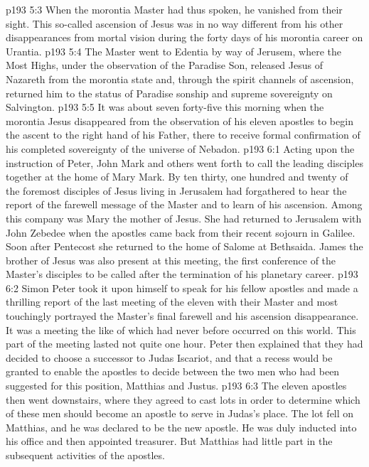 \pc \vs p193 5:3 When the morontia Master had thus spoken, he vanished from their sight. This so\hyp{}called ascension of Jesus was in no way different from his other disappearances from mortal vision during the forty days of his morontia career on Urantia.
\vs p193 5:4 The Master went to Edentia by way of Jerusem, where the Most Highs, under the observation of the Paradise Son, released Jesus of Nazareth from the morontia state and, through the spirit channels of ascension, returned him to the status of Paradise sonship and supreme sovereignty on Salvington.\plusone
\vs p193 5:5 It was about seven forty\hyp{}five this morning when the morontia Jesus disappeared from the observation of his eleven apostles to begin the ascent to the right hand of his Father, there to receive formal confirmation of his completed sovereignty of the universe of Nebadon.
\vs p193 6:1 Acting upon the instruction of Peter, John Mark and others went forth to call the leading disciples together at the home of Mary Mark. By ten thirty, one hundred and twenty of the foremost disciples of Jesus living in Jerusalem had forgathered to hear the report of the farewell message of the Master and to learn of his ascension. Among this company was Mary the mother of Jesus. She had returned to Jerusalem with John Zebedee when the apostles came back from their recent sojourn in Galilee. Soon after Pentecost she returned to the home of Salome at Bethsaida. James the brother of Jesus was also present at this meeting, the first conference of the Master’s disciples to be called after the termination of his planetary career.
\vs p193 6:2 Simon Peter took it upon himself to speak for his fellow apostles and made a thrilling report of the last meeting of the eleven with their Master and most touchingly portrayed the Master’s final farewell and his ascension disappearance. It was a meeting the like of which had never before occurred on this world. This part of the meeting lasted not quite one hour. Peter then explained that they had decided to choose a successor to Judas Iscariot, and that a recess would be granted to enable the apostles to decide between the two men who had been suggested for this position, Matthias and Justus.
\vs p193 6:3 The eleven apostles then went downstairs, where they agreed to cast lots in order to determine which of these men should become an apostle to serve in Judas’s place. The lot fell on Matthias, and he was declared to be the new apostle. He was duly inducted into his office and then appointed treasurer. But Matthias had little part in the subsequent activities of the apostles.
